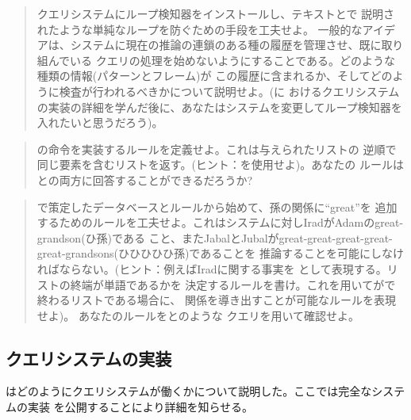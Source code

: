 \begin{quote}
クエリシステムにループ検知器をインストールし、テキストとで
説明されたような単純なループを防ぐための手段を工夫せよ。
一般的なアイデアは、システムに現在の推論の連鎖のある種の履歴を管理させ、既に取り組んでいる
クエリの処理を始めないようにすることである。どのような種類の情報(パターンとフレーム)が
この履歴に含まれるか、そしてどのように検査が行われるべきかについて説明せよ。(に
おけるクエリシステムの実装の詳細を学んだ後に、あなたはシステムを変更してループ検知器を
入れたいと思うだろう)。
\end{quote}

\begin{quote}
の命令を実装するルールを定義せよ。これは与えられたリストの
逆順で同じ要素を含むリストを返す。(ヒント：を使用せよ)。あなたの
ルールはとの両方に回答することができるだろうか?
\end{quote}

\begin{quote}
で策定したデータベースとルールから始めて、孫の関係に``great''を
追加するためのルールを工夫せよ。これはシステムに対しIradがAdamのgreat-grandson(ひ孫)である
こと、またJabalとJubalがgreat-great-great-great-great-grandsons(ひひひひひ孫)であることを
推論することを可能にしなければならない。(ヒント：例えばIradに関する事実を
として表現する。リストの終端が単語であるかを
決定するルールを書け。これを用いてがで終わるリストである場合に、
関係を導き出すことが可能なルールを表現せよ)。
あなたのルールをとのような
クエリを用いて確認せよ。
\end{quote}

\subsection{クエリシステムの実装}
\label{Sec. 4.4.4}
\label{Section 4.4.4}


はどのようにクエリシステムが働くかについて説明した。ここでは完全なシステムの実装
を公開することにより詳細を知らせる。



